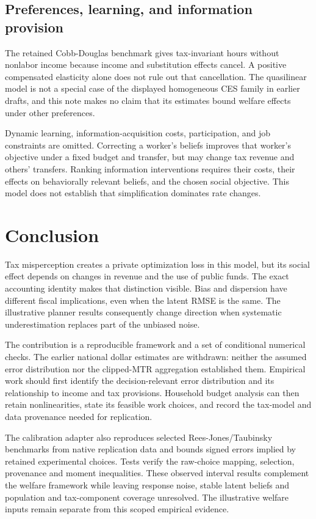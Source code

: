 \documentclass[
  11pt,
  letterpaper,
  DIV=11,
  numbers=noendperiod]{scrartcl}
\begin{document}
\subsection{Preferences, learning, and information
provision}\label{preferences-learning-and-information-provision}

The retained Cobb-Douglas benchmark gives tax-invariant hours without
nonlabor income because income and substitution effects cancel. A
positive compensated elasticity alone does not rule out that
cancellation. The quasilinear model is not a special case of the
displayed homogeneous CES family in earlier drafts, and this note makes
no claim that its estimates bound welfare effects under other
preferences.

Dynamic learning, information-acquisition costs, participation, and job
constraints are omitted. Correcting a worker's beliefs improves that
worker's objective under a fixed budget and transfer, but may change tax
revenue and others' transfers. Ranking information interventions
requires their costs, their effects on behaviorally relevant beliefs,
and the chosen social objective. This model does not establish that
simplification dominates rate changes.

\section{Conclusion}\label{conclusion}

Tax misperception creates a private optimization loss in this model, but
its social effect depends on changes in revenue and the use of public
funds. The exact accounting identity makes that distinction visible.
Bias and dispersion have different fiscal implications, even when the
latent RMSE is the same. The illustrative planner results consequently
change direction when systematic underestimation replaces part of the
unbiased noise.

The contribution is a reproducible framework and a set of conditional
numerical checks. The earlier national dollar estimates are withdrawn:
neither the assumed error distribution nor the clipped-MTR aggregation
established them. Empirical work should first identify the
decision-relevant error distribution and its relationship to income and
tax provisions. Household budget analysis can then retain
nonlinearities, state its feasible work choices, and record the
tax-model and data provenance needed for replication.

The calibration adapter also reproduces selected Rees-Jones/Taubinsky
benchmarks from native replication data and bounds signed errors implied
by retained experimental choices. Tests verify the raw-choice mapping,
selection, provenance and moment inequalities. These observed interval
results complement the welfare framework while leaving response noise,
stable latent beliefs and population and tax-component coverage
unresolved. The illustrative welfare inputs remain separate from this
scoped empirical evidence.
\end{document}
